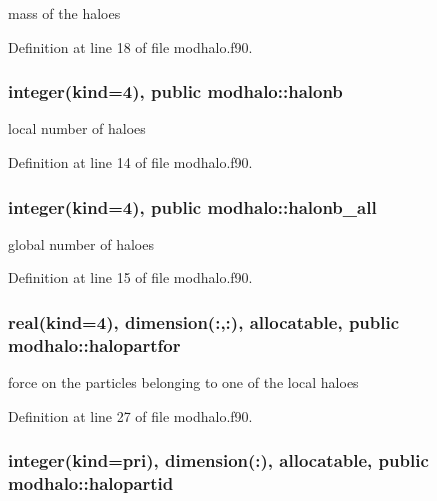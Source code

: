 mass of the haloes 



Definition at line 18 of file modhalo.\-f90.

\hypertarget{classmodhalo_aa38fb84fd13087a625a48555740b9f2d}{
\subsubsection[{halonb}]{\setlength{\rightskip}{0pt plus 5cm}integer(kind=4), public modhalo\-::halonb}}\label{classmodhalo_aa38fb84fd13087a625a48555740b9f2d}


local number of haloes 



Definition at line 14 of file modhalo.\-f90.

\hypertarget{classmodhalo_ad416ab5cda1e3a837e8392415f305ffd}{
\subsubsection[{halonb\-\_\-all}]{\setlength{\rightskip}{0pt plus 5cm}integer(kind=4), public modhalo\-::halonb\-\_\-all}}\label{classmodhalo_ad416ab5cda1e3a837e8392415f305ffd}


global number of haloes 



Definition at line 15 of file modhalo.\-f90.

\hypertarget{classmodhalo_af8ef97601340370e842fce756e116863}{
\subsubsection[{halopartfor}]{\setlength{\rightskip}{0pt plus 5cm}real(kind=4), dimension(\-:,\-:), allocatable, public modhalo\-::halopartfor}}\label{classmodhalo_af8ef97601340370e842fce756e116863}


force on the particles belonging to one of the local haloes 



Definition at line 27 of file modhalo.\-f90.

\hypertarget{classmodhalo_a2355dfa04d7ba9d48277d3f4d1e44a64}{
\subsubsection[{halopartid}]{\setlength{\rightskip}{0pt plus 5cm}integer(kind=pri), dimension(\-:), allocatable, public modhalo\-::halopartid}}\label{classmodhalo_a2355dfa04d7ba9d48277d3f4d1e44a64}


